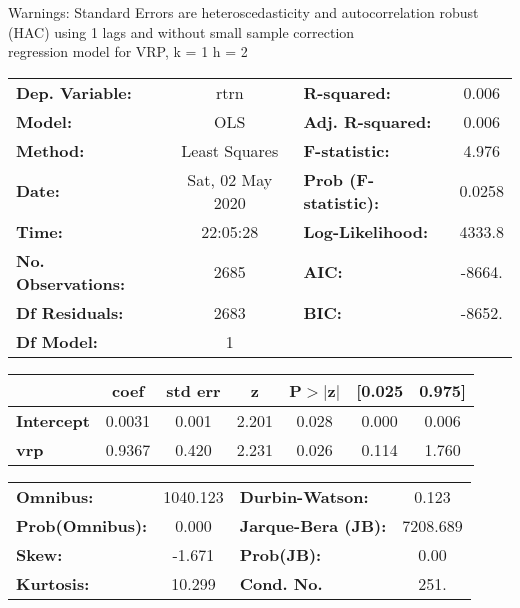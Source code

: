 Warnings: \newline
 [1] Standard Errors are heteroscedasticity and autocorrelation robust (HAC) using 1 lags and without small sample correction\\ 

regression model for VRP, k = 1 h = 2\begin{center}
\begin{tabular}{lclc}
\toprule
\textbf{Dep. Variable:}    &       rtrn       & \textbf{  R-squared:         } &     0.006   \\
\textbf{Model:}            &       OLS        & \textbf{  Adj. R-squared:    } &     0.006   \\
\textbf{Method:}           &  Least Squares   & \textbf{  F-statistic:       } &     4.976   \\
\textbf{Date:}             & Sat, 02 May 2020 & \textbf{  Prob (F-statistic):} &   0.0258    \\
\textbf{Time:}             &     22:05:28     & \textbf{  Log-Likelihood:    } &    4333.8   \\
\textbf{No. Observations:} &        2685      & \textbf{  AIC:               } &    -8664.   \\
\textbf{Df Residuals:}     &        2683      & \textbf{  BIC:               } &    -8652.   \\
\textbf{Df Model:}         &           1      & \textbf{                     } &             \\
\bottomrule
\end{tabular}
\begin{tabular}{lcccccc}
                   & \textbf{coef} & \textbf{std err} & \textbf{z} & \textbf{P$> |$z$|$} & \textbf{[0.025} & \textbf{0.975]}  \\
\midrule
\textbf{Intercept} &       0.0031  &        0.001     &     2.201  &         0.028        &        0.000    &        0.006     \\
\textbf{vrp}       &       0.9367  &        0.420     &     2.231  &         0.026        &        0.114    &        1.760     \\
\bottomrule
\end{tabular}
\begin{tabular}{lclc}
\textbf{Omnibus:}       & 1040.123 & \textbf{  Durbin-Watson:     } &    0.123  \\
\textbf{Prob(Omnibus):} &   0.000  & \textbf{  Jarque-Bera (JB):  } & 7208.689  \\
\textbf{Skew:}          &  -1.671  & \textbf{  Prob(JB):          } &     0.00  \\
\textbf{Kurtosis:}      &  10.299  & \textbf{  Cond. No.          } &     251.  \\
\bottomrule
\end{tabular}
\end{center}

